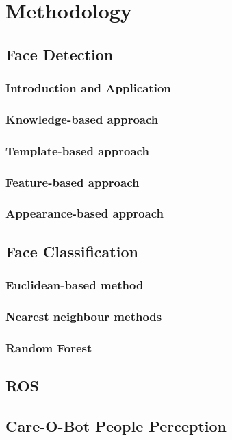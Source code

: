 \chapter{Methodology}

  \section{Face Detection}
    \subsection{Introduction and Application}
    \subsection{Knowledge-based approach}
    \subsection{Template-based approach}
    \subsection{Feature-based approach}
    \subsection{Appearance-based approach}

   

  \section{Face Classification}
    \subsection{Euclidean-based method}
    \subsection{Nearest neighbour methods}
    \subsection{Random Forest}

  \section{ROS}
  \section{Care-O-Bot People Perception}
